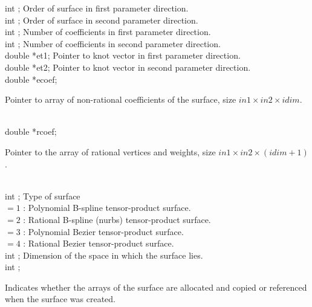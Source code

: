   \>int         ;    \>\>Order of surface in first parameter direction.     \\
  \>int         ;    \>\>Order of surface in second parameter direction.    \\
  \>int         ;    \>\>Number of coefficients in first parameter direction.  \\
  \>int         ;    \>\>Number of coefficients in second parameter direction. \\
  \>double      \>*{\fov et1};   \>\>Pointer to knot vector in first parameter direction.  \\
  \>double      \>*{\fov et2};   \>\>Pointer to knot vector in second parameter direction. \\
  \>double      \>*{\fov ecoef}; \>\>
                \begin{minipg2}
                  Pointer to array of non-rational coefficients of the
                  surface, size $in1\times in2\times idim$.
                \end{minipg2}\\[0.8ex]
  \>double      \>*{\fov rcoef}; \>\>
                \begin{minipg2}
                  Pointer to the array of rational vertices and weights,
                  size $in1\times in2\times (idim+1)$.
                \end{minipg2}\\[0.8ex]
  \>int         ;  \>\>Type of surface\\
        \>\>\>\>     $= 1$ \>: Polynomial B-spline tensor-product surface.\\
        \>\>\>\>     $= 2$ \>: Rational B-spline (nurbs) tensor-product surface.\\
        \>\>\>\>     $= 3$ \>: Polynomial Bezier tensor-product surface.\\
        \>\>\>\>     $= 4$ \>: Rational Bezier tensor-product surface.\\
  \>int         ;   \>\>Dimension of the space in which the
                                        surface lies.  \\
\newpagetabs
  \>int         ;  \>\> \begin{minipg2}
                                Indicates whether the arrays of the surface are
                                allocated and copied or referenced
                                when the surface was created.
                                \end{minipg2}\\[0.8ex]
